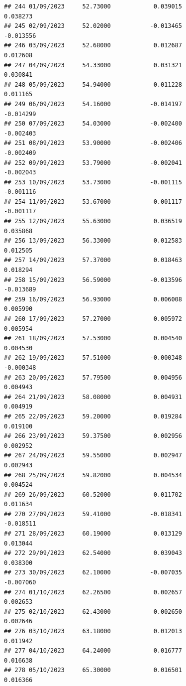 \documentclass[
]{article}
\begin{document}
\begin{verbatim}
## 244 01/09/2023     52.73000            0.039015                0.038273
## 245 02/09/2023     52.02000           -0.013465               -0.013556
## 246 03/09/2023     52.68000            0.012687                0.012608
## 247 04/09/2023     54.33000            0.031321                0.030841
## 248 05/09/2023     54.94000            0.011228                0.011165
## 249 06/09/2023     54.16000           -0.014197               -0.014299
## 250 07/09/2023     54.03000           -0.002400               -0.002403
## 251 08/09/2023     53.90000           -0.002406               -0.002409
## 252 09/09/2023     53.79000           -0.002041               -0.002043
## 253 10/09/2023     53.73000           -0.001115               -0.001116
## 254 11/09/2023     53.67000           -0.001117               -0.001117
## 255 12/09/2023     55.63000            0.036519                0.035868
## 256 13/09/2023     56.33000            0.012583                0.012505
## 257 14/09/2023     57.37000            0.018463                0.018294
## 258 15/09/2023     56.59000           -0.013596               -0.013689
## 259 16/09/2023     56.93000            0.006008                0.005990
## 260 17/09/2023     57.27000            0.005972                0.005954
## 261 18/09/2023     57.53000            0.004540                0.004530
## 262 19/09/2023     57.51000           -0.000348               -0.000348
## 263 20/09/2023     57.79500            0.004956                0.004943
## 264 21/09/2023     58.08000            0.004931                0.004919
## 265 22/09/2023     59.20000            0.019284                0.019100
## 266 23/09/2023     59.37500            0.002956                0.002952
## 267 24/09/2023     59.55000            0.002947                0.002943
## 268 25/09/2023     59.82000            0.004534                0.004524
## 269 26/09/2023     60.52000            0.011702                0.011634
## 270 27/09/2023     59.41000           -0.018341               -0.018511
## 271 28/09/2023     60.19000            0.013129                0.013044
## 272 29/09/2023     62.54000            0.039043                0.038300
## 273 30/09/2023     62.10000           -0.007035               -0.007060
## 274 01/10/2023     62.26500            0.002657                0.002653
## 275 02/10/2023     62.43000            0.002650                0.002646
## 276 03/10/2023     63.18000            0.012013                0.011942
## 277 04/10/2023     64.24000            0.016777                0.016638
## 278 05/10/2023     65.30000            0.016501                0.016366

\end{verbatim}
\end{document}
